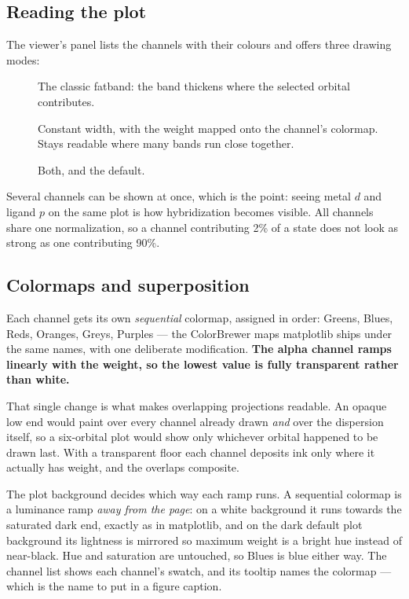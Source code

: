 \subsection{Reading the plot}

The viewer's  panel lists the channels with their
colours and offers three drawing modes:

\begin{description}
  \item[] The classic fatband: the band thickens where the
    selected orbital contributes.
  \item[] Constant width, with the weight mapped onto the
    channel's colormap. Stays readable where many bands run close together.
  \item[] Both, and the default.
\end{description}

Several channels can be shown at once, which is the point: seeing metal $d$
and ligand $p$ on the same plot is how hybridization becomes visible. All
channels share one normalization, so a channel contributing 2\% of a state
does not look as strong as one contributing 90\%.

\subsection{Colormaps and superposition}
\label{sec:fatband-colormaps}

Each channel gets its own \emph{sequential} colormap, assigned in order:
Greens, Blues, Reds, Oranges, Greys, Purples --- the ColorBrewer maps
matplotlib ships under the same names, with one deliberate modification.
\textbf{The alpha channel ramps linearly with the weight, so the lowest
value is fully transparent rather than white.}

That single change is what makes overlapping projections readable. An opaque
low end would paint over every channel already drawn \emph{and} over the
dispersion itself, so a six-orbital plot would show only whichever orbital
happened to be drawn last. With a transparent floor each channel deposits
ink only where it actually has weight, and the overlaps composite.

The plot background decides which way each ramp runs. A sequential colormap
is a luminance ramp \emph{away from the page}: on a white background it runs
towards the saturated dark end, exactly as in matplotlib, and on the dark
default plot background its lightness is mirrored so maximum weight is a
bright hue instead of near-black. Hue and saturation are untouched, so Blues
is blue either way. The channel list shows each channel's swatch, and its
tooltip names the colormap --- which is the name to put in a figure caption.

